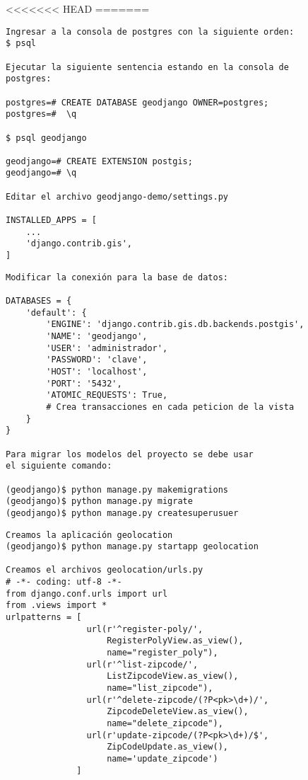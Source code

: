 \documentclass[xcolor=dvipsnames]{beamer}
\begin{document}
<<<<<<< HEAD
=======
\begin{frame}[fragile]
\begin{verbatim}
Ingresar a la consola de postgres con la siguiente orden:
$ psql

Ejecutar la siguiente sentencia estando en la consola de 
postgres:

postgres=# CREATE DATABASE geodjango OWNER=postgres;
postgres=#  \q

$ psql geodjango

geodjango=# CREATE EXTENSION postgis;
geodjango=# \q

Editar el archivo geodjango-demo/settings.py

INSTALLED_APPS = [
    ...
    'django.contrib.gis',
]
\end{verbatim}
\end{frame}

\begin{frame}[fragile]
\begin{verbatim}
Modificar la conexión para la base de datos:

DATABASES = {
    'default': {
        'ENGINE': 'django.contrib.gis.db.backends.postgis',
        'NAME': 'geodjango',
        'USER': 'administrador',
        'PASSWORD': 'clave',
        'HOST': 'localhost',
        'PORT': '5432',
        'ATOMIC_REQUESTS': True, 
        # Crea transacciones en cada peticion de la vista
    }
}

Para migrar los modelos del proyecto se debe usar 
el siguiente comando:

(geodjango)$ python manage.py makemigrations
(geodjango)$ python manage.py migrate
(geodjango)$ python manage.py createsuperusuer
\end{verbatim}
\end{frame}

\begin{frame}[fragile]
\begin{verbatim}
Creamos la aplicación geolocation
(geodjango)$ python manage.py startapp geolocation

Creamos el archivos geolocation/urls.py
# -*- coding: utf-8 -*-
from django.conf.urls import url
from .views import *
urlpatterns = [
                url(r'^register-poly/',
                    RegisterPolyView.as_view(),
                    name="register_poly"),
                url(r'^list-zipcode/',
                    ListZipcodeView.as_view(),
                    name="list_zipcode"),
                url(r'^delete-zipcode/(?P<pk>\d+)/',
                    ZipcodeDeleteView.as_view(),
                    name="delete_zipcode"),
                url(r'update-zipcode/(?P<pk>\d+)/$',
                    ZipCodeUpdate.as_view(),
                    name='update_zipcode')
              ]
\end{verbatim}
\end{frame}
\end{document}
